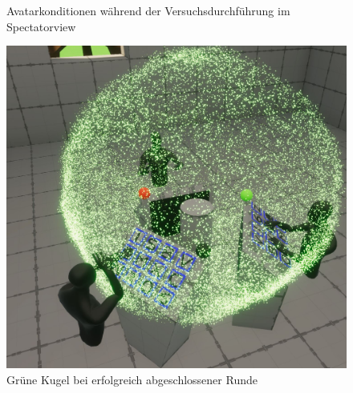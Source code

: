 \documentclass[a4paper,11pt]{article}%
\renewcommand{\\}{\vspace*{0.5\baselineskip} \newline}
\begin{document}
\begin{figure}[h]
  \centering
  \qquad
  \caption{Avatarkonditionen während der Versuchsdurchführung im Spectatorview}
  \label{AvatareImEinsatz}
\end{figure}

\begin{figure}[H]
		\begin{footnotesize}
		\centering
			\includegraphics[scale=0.2]{Abbildungen/RoundSuccsessful.JPG}\\
			\caption[Abbildung 1]{Grüne Kugel bei erfolgreich abgeschlossener Runde}
			\label{RoundFinished}
		\end{footnotesize}
	\end{figure}
\end{document}
